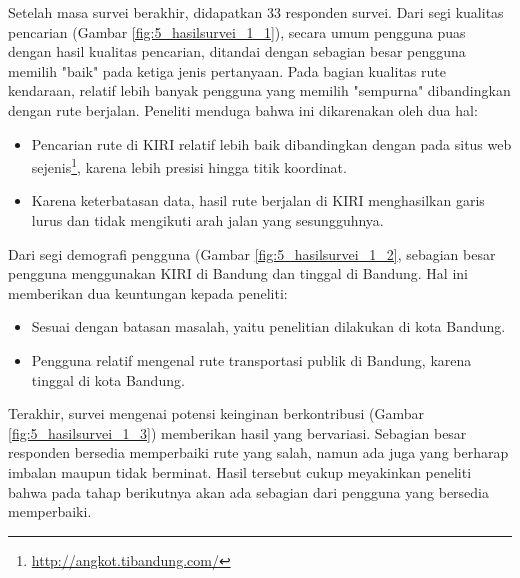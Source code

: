 Setelah masa survei berakhir, didapatkan 33 responden survei. Dari segi kualitas pencarian (Gambar \ref{fig:5_hasilsurvei_1_1}), secara umum pengguna puas dengan hasil kualitas pencarian, ditandai dengan sebagian besar pengguna memilih "baik" pada ketiga jenis pertanyaan. Pada bagian kualitas rute kendaraan, relatif lebih banyak pengguna yang memilih "sempurna" dibandingkan dengan rute berjalan. Peneliti menduga bahwa ini dikarenakan oleh dua hal:

\begin{itemize}
	\item Pencarian rute di KIRI relatif lebih baik dibandingkan dengan pada situs web sejenis\footnote{\url{http://angkot.tibandung.com/}}, karena lebih presisi hingga titik koordinat.
	\item Karena keterbatasan data, hasil rute berjalan di KIRI menghasilkan garis lurus dan tidak mengikuti arah jalan yang sesungguhnya.
\end{itemize}

Dari segi demografi pengguna (Gambar \ref{fig:5_hasilsurvei_1_2}, sebagian besar pengguna menggunakan KIRI di Bandung dan tinggal di Bandung. Hal ini memberikan dua keuntungan kepada peneliti:

\begin{itemize}
	\item Sesuai dengan batasan masalah, yaitu penelitian dilakukan di kota Bandung.
	\item Pengguna relatif mengenal rute transportasi publik di Bandung, karena tinggal di kota Bandung.
\end{itemize}

Terakhir, survei mengenai potensi keinginan berkontribusi (Gambar \ref{fig:5_hasilsurvei_1_3}) memberikan hasil yang bervariasi. Sebagian besar responden bersedia memperbaiki rute yang salah, namun ada juga yang berharap imbalan maupun tidak berminat. Hasil tersebut cukup meyakinkan peneliti bahwa pada tahap berikutnya akan ada sebagian dari pengguna yang bersedia memperbaiki.

